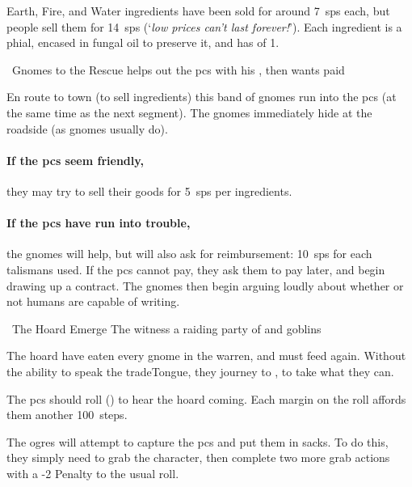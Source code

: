 Earth, Fire, and Water \glspl{ingredient} have been sold for around 7~\glspl{sp} each, but people sell them for 14~\glspl{sp} (`\textit{low prices can't last forever!}').
Each \gls{ingredient} is a phial, encased in fungal oil to preserve it, and has  of 1.

{\squash~Gnomes to the Rescue}%
{ helps out the \glspl{pc} with his , then wants paid}%

En route to town (to sell \glspl{ingredient}) this band of gnomes run into the \glspl{pc} (at the same time as the next \gls{segment}).
The gnomes immediately hide at the roadside (as gnomes usually do).

\paragraph{If the \glspl{pc} seem friendly,}
they may try to sell their goods for 5~\glspl{sp} per \glspl{ingredient}.

\paragraph{If the \glspl{pc} have run into trouble,}
the gnomes will help, but will also ask for reimbursement: 10~\glspl{sp} for each \glspl{talisman} used.
If the \glspl{pc} cannot pay, they ask them to pay later, and begin drawing up a contract.
The gnomes then begin arguing loudly about whether or not humans are capable of writing.

{~The Hoard Emerge}%
{The  witness a raiding party of  and goblins}%

\begin{exampletext}
  The hoard have eaten every gnome in the \gls{warren}, and must feed again.
  Without the ability to speak the \gls{tradeTongue}, they journey to , to take what they can.
\end{exampletext}

The \glspl{pc} should roll  (\tn[5]) to hear the hoard coming.
Each margin on the roll affords them another 100~\glspl{step}.

\ogre

\ogre

\ogre

The \glspl{ogre} will attempt to capture the \glspl{pc} and put them in sacks.
To do this, they simply need to grab the character,%
then complete two more grab actions with a -2 Penalty to the usual roll.

